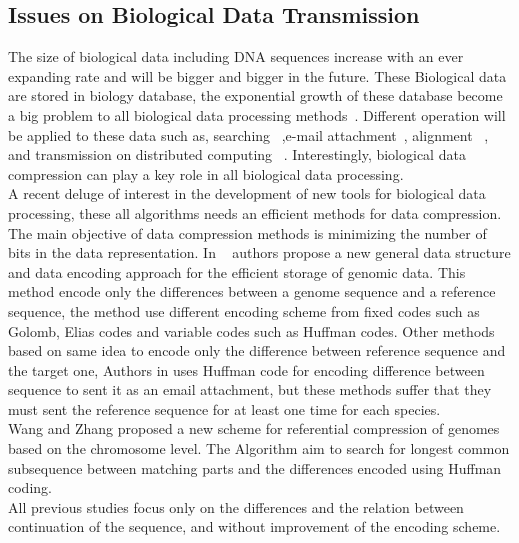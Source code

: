 \documentclass[preprint,12pt]{elsarticle}
\begin{document}
\subsection{Issues on Biological Data Transmission}
The size of biological data including DNA sequences increase with an ever expanding rate and will be bigger and bigger in the future. These Biological data are stored in biology database, the exponential growth of these database become a big problem to all biological data processing methods~\cite{Doug08}.
Different operation will be applied to these data such as, searching ~\cite{val10},e-mail attachment~\cite{chr09}, alignment ~\cite{che03}, and transmission on distributed computing ~\cite{cha14}. Interestingly, biological data compression can play a key role in all biological data processing.\\  
A recent deluge of interest in the development of new tools for biological data processing, these all algorithms needs an efficient methods for data compression. The main objective of data compression methods is minimizing the number of bits in the data representation. 
In ~\cite{bra09} authors propose a new general data structure and data encoding approach for the efficient storage of genomic data. This method encode only the differences between a genome sequence and a reference sequence, the method use different encoding scheme from fixed codes such as Golomb, Elias codes and variable codes such as Huffman codes. Other methods based on same idea to encode only the difference between reference sequence and the target one, Authors in \cite{chr09} uses Huffman code for encoding difference between sequence to sent it as an email attachment, but these methods suffer that they must sent the reference sequence for at least one time for each species.\\
Wang and Zhang \cite{wan11} proposed a new scheme for referential compression of genomes based on the chromosome level. The Algorithm aim to search for longest common subsequence between matching parts and the differences encoded using Huffman coding.\\
All previous studies focus only on the differences and the relation between continuation of the sequence, and without improvement of the encoding scheme.

\end{document}
